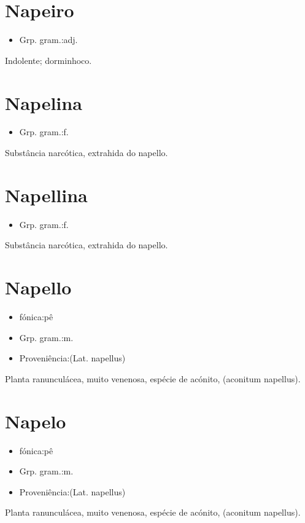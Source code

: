 \section{Napeiro}
\begin{itemize}
\item {Grp. gram.:adj.}
\end{itemize}
Indolente; dorminhoco.
\section{Napelina}
\begin{itemize}
\item {Grp. gram.:f.}
\end{itemize}
Substância narcótica, extrahida do napello.
\section{Napellina}
\begin{itemize}
\item {Grp. gram.:f.}
\end{itemize}
Substância narcótica, extrahida do napello.
\section{Napello}
\begin{itemize}
\item {fónica:pê}
\end{itemize}
\begin{itemize}
\item {Grp. gram.:m.}
\end{itemize}
\begin{itemize}
\item {Proveniência:(Lat. \textunderscore napellus\textunderscore )}
\end{itemize}
Planta ranunculácea, muito venenosa, espécie de acónito, (\textunderscore aconitum napellus\textunderscore ).
\section{Napelo}
\begin{itemize}
\item {fónica:pê}
\end{itemize}
\begin{itemize}
\item {Grp. gram.:m.}
\end{itemize}
\begin{itemize}
\item {Proveniência:(Lat. \textunderscore napellus\textunderscore )}
\end{itemize}
Planta ranunculácea, muito venenosa, espécie de acónito, (\textunderscore aconitum napellus\textunderscore ).
